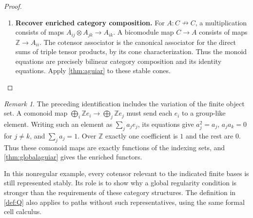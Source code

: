 \documentclass[11pt,reqno]{amsart}
\theoremstyle{plain}
\theoremstyle{definition}
\theoremstyle{remark}
\newtheorem{remark}[theorem]{Remark}
\numberwithin{equation}{section}
\newcommand{\harr}{\mathrel{\nrightarrow}}
\begin{document}
\begin{proof}
\begin{enumerate}
\item \textbf{Recover enriched category composition.} For $A:C\harr C$, a multiplication consists of maps
$A_{ij}\otimes A_{jk}\to A_{ik}$. A bicomodule map $C\to A$
consists of maps $\mathbb Z\to A_{ii}$. The cotensor associator is
the canonical associator for the direct sums of triple tensor products,
by its cone characterization. Thus the monoid equations are precisely
bilinear category composition and its identity equations. Apply
\cref{thm:aguiar} to these stable cones.\qedhere
\end{enumerate}
\end{proof}

\begin{remark}
The preceding identification includes the variation of the finite
object set. A comonoid map
$\bigoplus_i\mathbb Z e_i\to\bigoplus_j\mathbb Z e_j$ must send
each $e_i$ to a group-like element. Writing such an element as
$\sum_j a_je_j$, its equations give $a_j^2=a_j$, $a_ja_k=0$ for
$j\ne k$, and $\sum_j a_j=1$. Over $\mathbb Z$ exactly one
coefficient is $1$ and the rest are $0$. Thus these comonoid maps are
exactly functions of the indexing sets, and \cref{thm:globalaguiar}
gives the enriched functors.
\end{remark}

In this nonregular example, every cotensor relevant to the indicated
finite bases is still represented stably. Its role is to show why a global
regularity condition is stronger than the requirements of these category
structures. The definition in \cref{def:Q} also applies to paths without
such representatives, using the same formal cell calculus.
\end{document}

